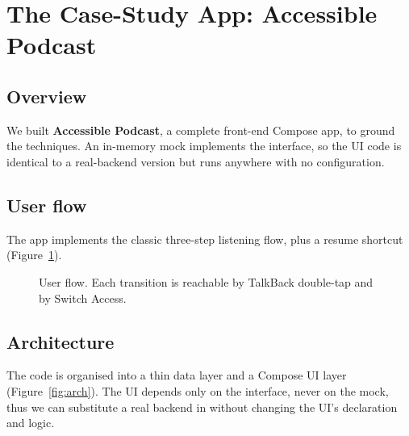 \section{The Case-Study App: Accessible Podcast}
\label{sec:casestudy}

\subsection{Overview}

We built \textbf{Accessible Podcast}, a complete front-end Compose app, to ground the techniques. An
in-memory mock implements the  interface, so the UI code is identical to a real-backend version but runs anywhere with no configuration.

\subsection{User flow}

The app implements the classic three-step listening flow, plus a resume shortcut
(Figure~\ref{fig:flow}).

\begin{figure}[h]
	\centering
	\caption{User flow. Each transition is reachable by TalkBack double-tap and by Switch Access.}
	\label{fig:flow}
\end{figure}

\subsection{Architecture}

The code is organised into a thin data layer and a Compose UI layer
(Figure~\ref{fig:arch}). The UI depends
only on the  interface, never on the mock, thus we can substitute a real backend in without changing the UI's declaration and logic.

